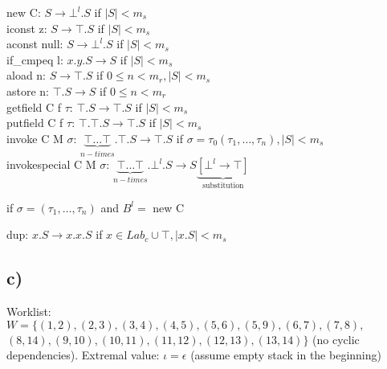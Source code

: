 \documentclass[fleqn,12pt]{article}
\begin{document}
new C: $S \rightarrow \bot^l.S$ if $|S| < m_s$\\
iconst z: $S \rightarrow \top.S$ if $|S| < m_s$\\
aconst null: $S \rightarrow \bot^l.S$ if $|S| < m_s$\\
if\_cmpeq l: $x.y.S \rightarrow S$ if $|S| < m_s$\\
aload n: $S \rightarrow \top.S$ if $0\leq n < m_r, |S| < m_s$\\
astore n: $\top.S \rightarrow S$ if $0\leq n < m_r$\\
getfield C f $\tau$: $\top.S \rightarrow \top.S$ if $|S| < m_s$\\
putfield C f $\tau$: $\top.\top.S \rightarrow \top.S$ if $|S| < m_s$ \\
invoke C M $\sigma$: $\underbrace{\top\dots\top}_{n-times}.\top.S \rightarrow \top.S$ if $\sigma = \tau_0(\tau_1,\dots,\tau_n),|S| < m_s$\\
invokespecial C M $\sigma$: $\underbrace{\top\dots\top}_{n-times}.\bot^l.S \rightarrow S\underbrace{[\bot^l \rightarrow \top]}_{\text{substitution}}$ 
\begin{flushright}
if $\sigma = (\tau_1,\dots,\tau_n)$ and $B^l =$ new C
\end{flushright}
dup: $x.S \rightarrow x.x.S$ if $x \in Lab_c \cup \top, |x.S| < m_s$\\
\subsection*{c)}
Worklist: $W = \{ (1,2),(2,3),(3,4),(4,5),(5,6),(5,9),(6,7),(7,8),$\\
$(8,14),(9,10),(10,11),(11,12),(12,13),(13,14) \}$ (no cyclic dependencies).
Extremal value: $\iota = \epsilon$ (assume empty stack in the beginning)\\
\end{document}

